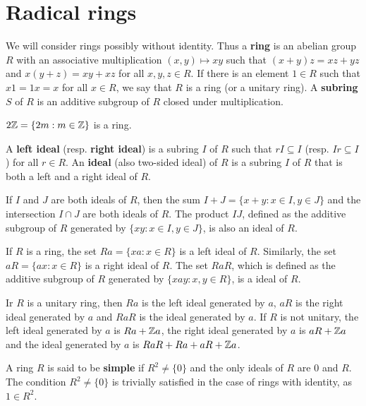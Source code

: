 \chapter{Radical rings}
\label{radical}

We will consider rings possibly without identity. Thus a 
\textbf{ring} is an abelian group $R$ with an associative multiplication 
$(x,y)\mapsto xy$ such that $(x+y)z=xz+yz$ and $x(y+z)=xy+xz$ for all $x,y,z\in
R$. If there is an element $1\in R$ such that $x1=1x=x$ for all $x\in R$, we 
say that $R$ is a ring (or a unitary ring).  A \textbf{subring} $S$ of $R$ is an additive
subgroup of $R$ closed under multiplication. 

\begin{example}
	$2\mathbb{Z}=\{2m:m\in\mathbb{Z}\}$ is a ring.  
\end{example}

A \textbf{left ideal} (resp. \textbf{right ideal}) is a subring $I$ of $R$ such that 
$rI\subseteq I$ (resp. $Ir\subseteq I$) for all $r\in R$. An \textbf{ideal}
(also two-sided ideal) of $R$ is a subring $I$ of $R$ that is both a left and a right ideal of $R$.

\begin{example}
If $I$ and $J$ are both ideals of $R$, then the sum $I+J=\{x+y:x\in I,y\in J\}$ and
the intersection $I\cap J$ are both ideals of $R$. The product $IJ$, defined as the additive
subgroup of $R$ generated by $\{xy:x\in I,y\in J\}$, is also an ideal of $R$. 
\end{example}

\begin{example}
If $R$ is a ring, the set $Ra =\{xa: x\in R\}$ is a left ideal
of $R$. Similarly, the set $aR =\{ax: x\in R\}$ is a right ideal of $R$. The set $RaR$, which is
defined as the additive subgroup of $R$ generated by $\{xay: x, y\in R\}$, is a
ideal of $R$.
\end{example}

\begin{example}
	Ir $R$ is a unitary ring, then $Ra$ is the left ideal generated by $a$, $aR$ is
	the right ideal generated by $a$ and $RaR$ is the ideal generated by $a$. 
	If $R$ is not unitary, the left ideal generated by $a$ is $Ra+\mathbb{Z} a$,
	the right ideal generated by $a$ is $aR+\mathbb{Z} a$ and the ideal generated by 
	$a$ is $RaR+Ra+aR+\mathbb{Z} a$.
\end{example}

A ring $R$ is said to be \textbf{simple} if $R^2\ne\{0\}$ and the only ideals of 
$R$ are $0$ and $R$. The condition $R^2\ne\{0\}$ is trivially satisfied in the case of rings
with identity, as $1\in R^2$. 


